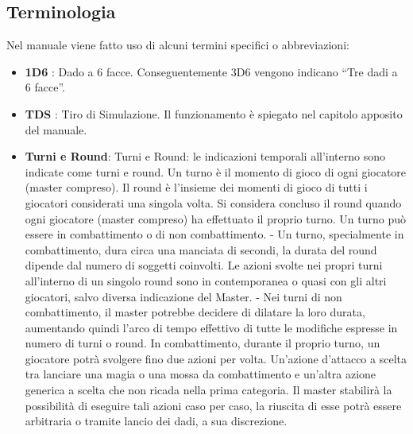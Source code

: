 \documentclass[../manuale_main.tex]{subfiles}
\begin{document}
\clearpage

\subsection{Terminologia}
Nel manuale viene fatto uso di alcuni termini specifici o abbreviazioni:
\begin{itemize}
\item \textbf{1D6} : Dado a 6 facce. Conseguentemente 3D6 vengono indicano “Tre dadi a 6 facce”.
\item \textbf{TDS} : Tiro di Simulazione. Il funzionamento è spiegato nel capitolo apposito del manuale.
\item \textbf{Turni e Round}: Turni e Round: le indicazioni temporali all'interno sono indicate come turni e round. 
Un turno è il momento di gioco di ogni giocatore (master compreso). 
Il round è l’insieme dei momenti di gioco di tutti i giocatori considerati una singola volta. 
Si considera concluso il round quando ogni giocatore (master compreso) ha effettuato il proprio turno. Un turno può essere in combattimento o di non combattimento. 
- Un turno, specialmente  in combattimento, dura circa una manciata di secondi, la durata del round dipende dal numero di soggetti coinvolti. Le azioni svolte nei propri turni all'interno di un singolo round sono in contemporanea o quasi con gli altri giocatori, salvo diversa indicazione del Master. 
- Nei turni di non combattimento, il master potrebbe decidere di dilatare la loro durata, aumentando quindi l'arco di tempo effettivo di tutte le modifiche espresse in numero di turni o round. 
In combattimento, durante il proprio turno, un giocatore potrà svolgere fino due azioni per volta. Un'azione d'attacco a scelta tra lanciare una magia o una mossa da combattimento e un’altra azione generica a scelta che non ricada nella prima categoria. 
Il master stabilirà la possibilità di eseguire tali azioni caso per caso, la riuscita di esse potrà essere arbitraria o tramite lancio dei dadi, a sua discrezione.
\end{itemize}
\end{document}
